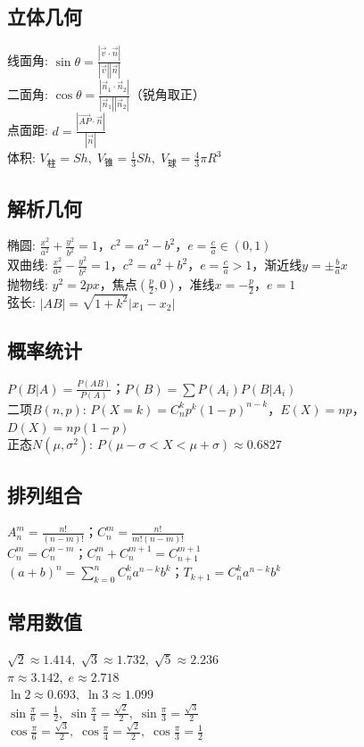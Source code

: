 \documentclass[12pt,a4paper,twocolumn]{ctexart}
\begin{document}
\subsection*{立体几何}
线面角: $\sin\theta=\frac{|\vec{v}\cdot\vec{n}|}{|\vec{v}||\vec{n}|}$ \\
二面角: $\cos\theta=\frac{|\vec{n}_1\cdot\vec{n}_2|}{|\vec{n}_1||\vec{n}_2|}$（锐角取正）\\
点面距: $d=\frac{|\overrightarrow{AP}\cdot\vec{n}|}{|\vec{n}|}$ \\
体积: $V_{\text{柱}}=Sh,\;V_{\text{锥}}=\frac13Sh,\;V_{\text{球}}=\frac43\pi R^3$

\subsection*{解析几何}
椭圆: $\frac{x^2}{a^2}+\frac{y^2}{b^2}=1$，$c^2=a^2-b^2$，$e=\frac{c}{a}\in(0,1)$ \\
双曲线: $\frac{x^2}{a^2}-\frac{y^2}{b^2}=1$，$c^2=a^2+b^2$，$e=\frac{c}{a}>1$，渐近线$y=\pm\frac{b}{a}x$ \\
抛物线: $y^2=2px$，焦点$(\frac{p}{2},0)$，准线$x=-\frac{p}{2}$，$e=1$ \\
弦长: $|AB|=\sqrt{1+k^2}|x_1-x_2|$

\subsection*{概率统计}
$P(B|A)=\frac{P(AB)}{P(A)}$；$P(B)=\sum P(A_i)P(B|A_i)$ \\
二项$B(n,p)$: $P(X=k)=C_n^kp^k(1-p)^{n-k}$，$E(X)=np$，$D(X)=np(1-p)$ \\
正态$N(\mu,\sigma^2)$: $P(\mu-\sigma<X<\mu+\sigma)\approx0.6827$

\subsection*{排列组合}
$A_n^m=\frac{n!}{(n-m)!}$；$C_n^m=\frac{n!}{m!(n-m)!}$ \\
$C_n^m=C_n^{n-m}$；$C_n^m+C_n^{m+1}=C_{n+1}^{m+1}$ \\
$(a+b)^n=\sum_{k=0}^n C_n^ka^{n-k}b^k$；$T_{k+1}=C_n^ka^{n-k}b^k$

\subsection*{常用数值}
$\sqrt2\approx1.414,\;\sqrt3\approx1.732,\;\sqrt5\approx2.236$ \\
$\pi\approx3.142,\;e\approx2.718$ \\
$\ln2\approx0.693,\;\ln3\approx1.099$ \\
$\sin\frac{\pi}{6}=\frac12,\;\sin\frac{\pi}{4}=\frac{\sqrt2}2,\;\sin\frac{\pi}{3}=\frac{\sqrt3}2$ \\
$\cos\frac{\pi}{6}=\frac{\sqrt3}2,\;\cos\frac{\pi}{4}=\frac{\sqrt2}2,\;\cos\frac{\pi}{3}=\frac12$
\end{document}
